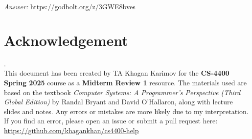 \documentclass{article}
\begin{document}
\noindent\textit{Answer: }\url{https://godbolt.org/z/3GWE8bves} \\

\section{Acknowledgement}. \\
\label{sec:ack}
This document has been created by TA Khagan Karimov for the \textbf{CS-4400 Spring 2025} course as a \textbf{Midterm Review 1} resource. The materials used are based on the textbook \textit{Computer Systems: A Programmer's Perspective (Third Global Edition)} by Randal Bryant and David O'Hallaron, along with lecture slides and notes. Any errors or mistakes are more likely due to my interpretation. If you find an error, please open an issue or submit a pull request here: 
\noindent\url{https://github.com/khagankhan/cs4400-help}
\end{document}
